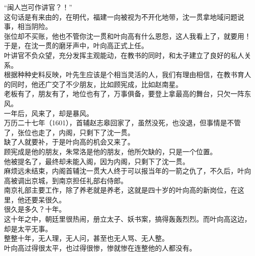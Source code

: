 \begin{multicols}{\theparacolNo}
“闽人岂可作讲官？！”\\

这句话是有来由的，在明代，福建一向被视为不开化地带，沈一贯拿地域问题说事，相当阴险。\\

张位却不买账，他也不管你沈一贯和叶向高有什么恩怨，这人我看上了，就要用！\\

于是，在沈一贯的磨牙声中，叶向高正式上任。\\

叶讲官不负众望，充分发挥主观能动，在教书的同时，和太子建立了良好的私人关系。\\

根据种种史料反映，叶先生应该是个相当灵活的人，我们有理由相信，在教书育人的同时，他还广交了不少朋友，比如顾宪成，比如赵南星。\\

老板有了，朋友有了，地位也有了，万事俱备，要登上拿最高的舞台，只欠一阵东风。\\

一年后，风来了，却是暴风。\\

万历二十七年（1601），首辅赵志皋回家了，虽然没死，也没退，但事情是不管了，张位也走了，内阁，只剩下了沈一贯。\\

缺了人就要补，于是叶向高的机会又来了。\\

顾宪成是他的朋友，朱常洛是他的朋友，他所欠缺的，只是一个位置。\\

他被提名了，最终却未能入阁，因为内阁，只剩下了沈一贯。\\

麻烦远未结束，内阁首辅沈一贯大人终于可以报当年的一箭之仇了，不久后，叶向高被调出京城，到南京担任礼部右侍郎。\\

南京礼部主要工作，除了养老就是养老，这就是四十岁的叶向高的新岗位，在这里，他还要呆很久。\\

很久是多久？十年。\\

这十年之中，朝廷里很热闹，册立太子、妖书案，搞得轰轰烈烈。而叶向高这边，却是太平无事。\\

整整十年，无人理，无人问，甚至也无人骂、无人整。\\

叶向高过得很太平，也过得很惨，惨就惨在连整他的人都没有。\\


\end{multicols}
